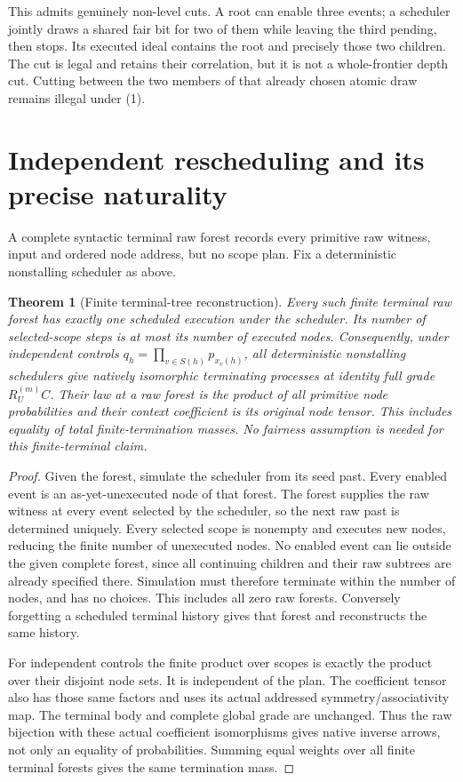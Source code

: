 \documentclass[11pt]{article}
\newtheorem{theorem}{Theorem}\newtheorem{proposition}[theorem]{Proposition}
\begin{document}
This admits genuinely non-level cuts. A root can enable three events; a scheduler jointly draws a shared fair bit for two of them while leaving the third pending, then stops. Its executed ideal contains the root and precisely those two children. The cut is legal and retains their correlation, but it is not a whole-frontier depth cut. Cutting between the two members of that already chosen atomic draw remains illegal under (1).

\section{Independent rescheduling and its precise naturality}
A complete syntactic terminal raw forest records every primitive raw witness, input and ordered node address, but no scope plan. Fix a deterministic nonstalling scheduler as above.

\begin{theorem}[Finite terminal-tree reconstruction]
Every such finite terminal raw forest has exactly one scheduled execution under the scheduler. Its number of selected-scope steps is at most its number of executed nodes. Consequently, under independent controls $q_h=\prod_{v\in S(h)}p_{x_v(h)}$, all deterministic nonstalling schedulers give natively isomorphic terminating processes at identity full grade $R_U^{(m)}C$. Their law at a raw forest is the product of all primitive node probabilities and their context coefficient is its original node tensor. This includes equality of total finite-termination masses. No fairness assumption is needed for this finite-terminal claim.
\end{theorem}
\begin{proof}
Given the forest, simulate the scheduler from its seed past. Every enabled event is an as-yet-unexecuted node of that forest. The forest supplies the raw witness at every event selected by the scheduler, so the next raw past is determined uniquely. Every selected scope is nonempty and executes new nodes, reducing the finite number of unexecuted nodes. No enabled event can lie outside the given complete forest, since all continuing children and their raw subtrees are already specified there. Simulation must therefore terminate within the number of nodes, and has no choices. This includes all zero raw forests. Conversely forgetting a scheduled terminal history gives that forest and reconstructs the same history.

For independent controls the finite product over scopes is exactly the product over their disjoint node sets. It is independent of the plan. The coefficient tensor also has those same factors and uses its actual addressed symmetry/associativity map. The terminal body and complete global grade are unchanged. Thus the raw bijection with these actual coefficient isomorphisms gives native inverse arrows, not only an equality of probabilities. Summing equal weights over all finite terminal forests gives the same termination mass.
\end{proof}
\end{document}
